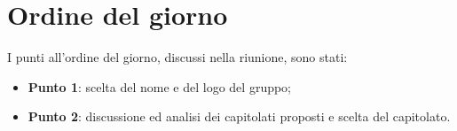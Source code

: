 \section{Ordine del giorno}
I punti all'ordine del giorno, discussi nella riunione, sono stati:
\begin{itemize}
	\item \textbf{Punto 1}: scelta del nome e del logo del gruppo; 
	\item \textbf{Punto 2}: discussione ed analisi dei capitolati proposti e scelta del capitolato. 
\end{itemize}
